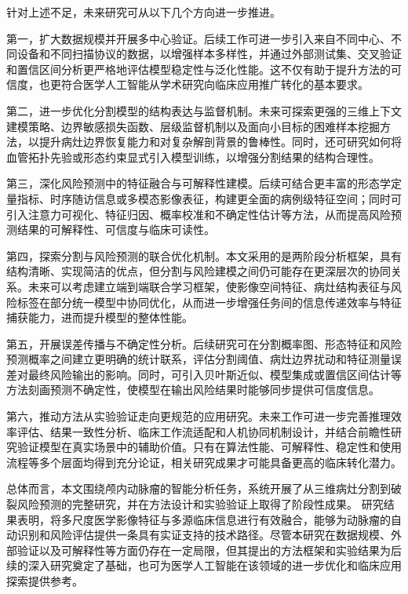 针对上述不足，未来研究可从以下几个方向进一步推进。

第一，扩大数据规模并开展多中心验证。后续工作可进一步引入来自不同中心、不同设备和不同扫描协议的数据，以增强样本多样性，并通过外部测试集、交叉验证和置信区间分析更严格地评估模型稳定性与泛化性能。这不仅有助于提升方法的可信度，也更符合医学人工智能从学术研究向临床应用推广转化的基本要求。

第二，进一步优化分割模型的结构表达与监督机制。未来可探索更强的三维上下文建模策略、边界敏感损失函数、层级监督机制以及面向小目标的困难样本挖掘方法，以提升病灶边界恢复能力和对复杂解剖背景的鲁棒性。同时，还可研究如何将血管拓扑先验或形态约束显式引入模型训练，以增强分割结果的结构合理性。

第三，深化风险预测中的特征融合与可解释性建模。后续可结合更丰富的形态学定量指标、时序随访信息或多模态影像表征，构建更全面的病例级特征空间；同时可引入注意力可视化、特征归因、概率校准和不确定性估计等方法，从而提高风险预测结果的可解释性、可信度与临床可读性。

第四，探索分割与风险预测的联合优化机制。本文采用的是两阶段分析框架，具有结构清晰、实现简洁的优点，但分割与风险建模之间仍可能存在更深层次的协同关系。未来可以考虑建立端到端联合学习框架，使影像空间特征、病灶结构表征与风险标签在部分统一模型中协同优化，从而进一步增强任务间的信息传递效率与特征捕获能力，进而提升模型的整体性能。

第五，开展误差传播与不确定性分析。后续研究可在分割概率图、形态特征和风险预测概率之间建立更明确的统计联系，评估分割阈值、病灶边界扰动和特征测量误差对最终风险输出的影响。同时，可引入贝叶斯近似、模型集成或置信区间估计等方法刻画预测不确定性，使模型在输出风险结果时能够同步提供可信度信息。

第六，推动方法从实验验证走向更规范的应用研究。未来工作可进一步完善推理效率评估、结果一致性分析、临床工作流适配和人机协同机制设计，并结合前瞻性研究验证模型在真实场景中的辅助价值。只有在算法性能、可解释性、稳定性和使用流程等多个层面均得到充分论证，相关研究成果才可能具备更高的临床转化潜力。



总体而言，本文围绕颅内动脉瘤的智能分析任务，系统开展了从三维病灶分割到破裂风险预测的完整研究，并在方法设计和实验验证上取得了阶段性成果。
研究结果表明，将多尺度医学影像特征与多源临床信息进行有效融合，能够为动脉瘤的自动识别和风险评估提供一条具有实证支持的技术路径。尽管本研究在数据规模、外部验证以及可解释性等方面仍存在一定局限，但其提出的方法框架和实验结果为后续的深入研究奠定了基础，也可为医学人工智能在该领域的进一步优化和临床应用探索提供参考。


